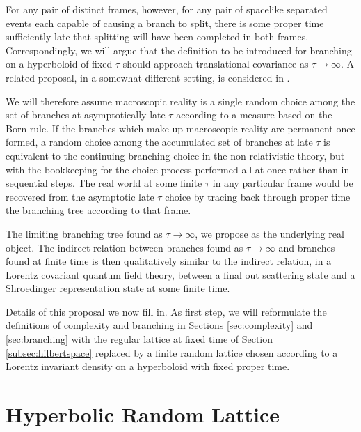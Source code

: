 \documentclass[twocolumn,amsmath,amssymb]{revtex4-1}
\begin{document}
For any pair of distinct frames, however,
for any pair of spacelike separated events 
each capable of causing a branch to split,
there is some proper time sufficiently late
that splitting will have been completed in both frames.
Correspondingly,
we will argue that the definition
to be introduced for branching
on a hyperboloid of fixed $\tau$
should approach translational covariance as 
$\tau \rightarrow \infty$.
A related proposal, in a somewhat different setting,
is considered in \cite{Kent, Kent1, Kent2}.



We will therefore assume
macroscopic reality is a single random choice 
among the set of branches at asymptotically late $\tau$
according to a measure based on the Born rule.
If the branches which make up macroscopic reality
are permanent once formed, a random
choice among the accumulated set of branches
at late $\tau$ is equivalent to the continuing 
branching choice in the non-relativistic theory,
but with the bookkeeping for the choice process performed all 
at once rather than in sequential steps.
The real world at some finite $\tau$ in any particular frame
would be recovered from the asymptotic late $\tau$ choice
by tracing back through proper time the branching tree according to that frame.


The limiting  branching tree found as $\tau \rightarrow \infty$,
we propose as the underlying real object.
The indirect relation between branches found
as $\tau \rightarrow \infty$ and branches
found at finite time
is then qualitatively similar to the indirect relation,
in a Lorentz covariant quantum field theory,
between a final out scattering state and
a Shroedinger representation state
at some finite time.

Details of this proposal we now fill in.
As first step, we will reformulate
the definitions of complexity and branching in Sections 
\ref{sec:complexity} and \ref{sec:branching} with the
regular lattice at fixed time of Section \ref{subsec:hilbertspace}
replaced by a finite random lattice 
chosen according to a Lorentz invariant density
on a hyperboloid with fixed proper time.


\section{\label{subsec:hyperboloid} Hyperbolic Random Lattice}
\end{document}
